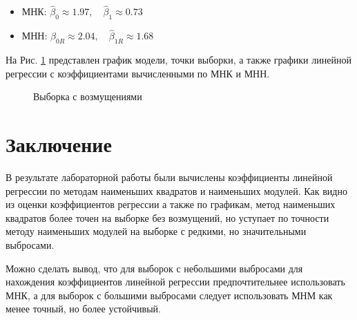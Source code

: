 \documentclass[12pt]{article}
\begin{document}
\begin{flushleft}
	\begin{itemize}
		\item МНК: $\hat{\beta}_0 \approx 1.97, \quad \hat{\beta}_1 \approx 0.73$
		\item МНН: $\hat{\beta}_{0R} \approx 2.04, \quad \hat{\beta}_{1R} \approx 1.68$
	\end{itemize}

	На Рис. \ref{reg2} представлен график модели, точки выборки, а также графики линейной регрессии с коэффициентами вычисленными по МНК и МНН.

	\begin{figure}[h]
		\caption{Выборка с возмущениями}
		\label{reg2}
	\end{figure}

\newpage

\section*{Заключение}

В результате лабораторной работы были вычислены коэффициенты линейной регрессии по методам наименьших квадратов и наименьших модулей. Как видно из оценки коэффициентов регрессии а также по графикам, метод наименьших квадратов более точен на выборке без возмущений, но уступает по точности методу наименьших модулей на выборке с редкими, но значительными выбросами.

Можно сделать вывод, что для выборок с небольшими выбросами для нахождения коэффициентов линейной регрессии предпочтительнее использовать МНК, а для выборок с большими выбросами следует использовать МНМ как менее точный, но более устойчивый.

\newpage

	\begin{thebibliography}{1}


\end{thebibliography}
\end{flushleft}
\end{document}
